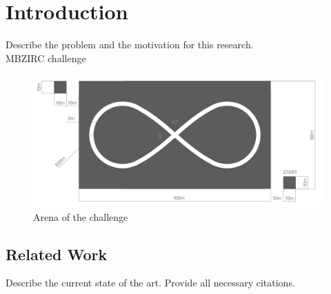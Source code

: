 \chapter{Introduction}\label{chap:introduction}

Describe the problem and the motivation for this research.
\\

MBZIRC challenge

\begin{figure}[!ht]
    \centering
    \includegraphics[width=1.1\textwidth]{img/arena.png}
    \caption{Arena of the challenge}
    \label{fig:arenachallenge}
\end{figure}



\section{Related Work}\label{sec:related_work}

Describe the current state of the art. Provide all necessary citations.
